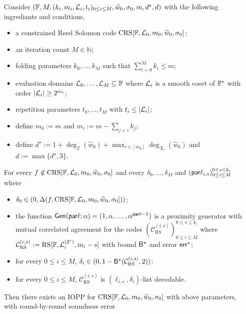 \begin{theorem}
    Consider $(\mathbb{F}, M, (k_i, m_i, \mathcal{L}_i, t_i)_{0 \leq i \leq M}, \widehat{w}_0, \sigma_0, m, d^\star, d)$ with the following ingrediants and conditions,
    \begin{itemize}
    \item a constrained Reed Solomon code $\mathrm{CRS}[\mathbb{F}, \mathcal{L}_0, m_0, \widehat{w}_0, \sigma_0]$;
    \item an iteration count $M \in \mathbb{N}$;
    \item folding parameters $k_0, \ldots, k_{M}$ such that $\sum_{i=0}^{M} k_i \leq m$;
    \item evaluation domains $\mathcal{L}_0, \ldots, \mathcal{L}_{M} \subseteq \mathbb{F}$ where $\mathcal{L}_i$ is a smooth coset of $\mathbb{F}^*$ with order $|\mathcal{L}_i| \geq 2^{m_i}$;
    \item repetition parameters $t_0, \ldots, t_M$ with $t_i \leq |\mathcal{L}_i|$;
    \item define $m_0 := m$ and $m_i := m - \sum_{j < i} k_j$;
    \item define $d^\star := 1 + \deg_{\mathbb{Z}}(\widehat{w}_0) + \max_{i \in [m_0]} \deg_{X_i}(\widehat{w}_0)$ and $d := \max\{d^\star, 3\}$.
    \end{itemize}
    For every $f \notin \mathrm{CRS}[\mathbb{F}, \mathcal{L}_0, m_0, \widehat{w}_0, \sigma_0]$ and every $\delta_0, \dots, \delta_{M}$ and $(\mathsf{par}\ell_{i,s})_{0 \leq i \leq M}^{0 \leq s \leq k_i}$ where
    \begin{itemize}
        \item $\delta_0 \in (0, \Delta(f, \mathrm{CRS}[\mathbb{F}, \mathcal{L}_0, m_0, \widehat{w}_0, \sigma_0]))$;
        \item the function $\mathsf{Gen}(\mathsf{par}\ell; \alpha) = (1, \alpha, \dots, \alpha^{\mathsf{par}\ell-1})$ is a proximity generator with mutual correlated agreement for the codes $(\mathcal{C}_{\mathrm{RS}}^{(i,s)})_{0 \leq i \leq M}^{0 \leq s \leq k_i}$ where $\mathcal{C}_{\mathrm{RS}}^{(i,s)} := \mathrm{RS}[\mathbb{F}, \mathcal{L}_i^{(2^s)}, m_i - s]$ with bound ${\mathsf{B}}^\star$ and error $\mathsf{err}^\star$;
        \item for every $0 \leq i \le M$, $\delta_i \in (0, 1 - {\mathsf{B}}^\star(\mathcal{C}_{\mathrm{RS}}^{(i,s)}, 2))$;
        \item for every $0 \leq i \le M$, $\mathcal{C}_{\mathrm{RS}}^{(i,s)}$ is $(\ell_{i,s}, \delta_i)$-list decodable.
    \end{itemize}
   Then there exists an IOPP for $\mathrm{CRS}[\mathbb{F}, \mathcal{L}_0, m_0, \widehat{w}_0, \sigma_0]$ with above parameters, with round-by-round soundness error


\end{theorem}
